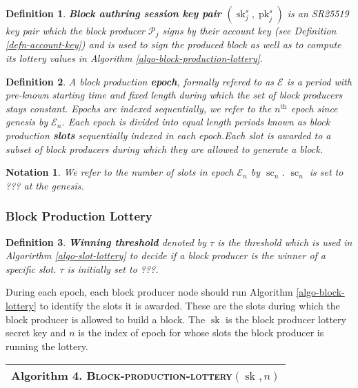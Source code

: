 \documentclass{article}
\newcommand{\tmname}[1]{\textsc{#1}}
\newcommand{\tmop}[1]{\ensuremath{\operatorname{#1}}}
\newcommand{\tmstrong}[1]{\textbf{#1}}
\newcommand{\tmtextbf}[1]{{\bfseries{#1}}}
\newcommand{\tmtextsc}[1]{{\scshape{#1}}}
\newcounter{tmcounter}
\newcommand{\custombinding}[1]{%
  \setcounter{tmcounter}{#1}%
  \addtocounter{tmcounter}{-1}%
  \refstepcounter{tmcounter}}
\newtheorem{definition}{Definition}
\newtheorem{notation}{Notation}
\providecommand{\tmname}[1]{\tmtextsc{#1}}
\providecommand{\tmop}[1]{\ensuremath{\mathrm{#1}}}
\providecommand{\tmstrong}[1]{\tmtextbf{#1}}
\providecommand{\tmtextbf}[1]{\tmtextbf{#1}}
\newtheorem{definition}{Definition}
\newtheorem{notation}{Notation}
\begin{document}
\begin{definition}
  {\tmstrong{Block authring session key pair $(\tmop{sk}^s_j,
  \tmop{pk}^s_j)$}} is an SR25519 key pair which the block producer
  $\mathcal{P}_j$ signs by their account key (see Definition
  \ref{defn-account-key}) and is used to sign the produced block as well as to
  compute its lottery values in Algorithm \ref{algo-block-production-lottery}.
  
\end{definition}

\begin{definition}
  A block production {\tmstrong{epoch}}, formally refered to as $\mathcal{E}$
  is a period with pre-known starting time and fixed length during which the
  set of block producers stays constant. Epochs are indexed sequentially, we
  refer to the $n^{\tmop{th}}$ epoch since genesis by $\mathcal{E}_n$. Each
  epoch is divided into equal length periods known as block production
  {\tmstrong{slots}} sequentially indexed in each epoch.Each slot is awarded
  to a subset of block producers during which they are allowed to generate a
  block.
\end{definition}

\begin{notation}
  We refer to the number of slots in epoch $\mathcal{E}_n$ by $\tmop{sc}_n$.
  $\tmop{sc}_n$ is set to ??? at the genesis. 
\end{notation}

\subsubsection{Block Production Lottery}

\begin{definition}
  {\tmstrong{Winning threshold}} denoted by {\tmstrong{$\tau$}} is the
  threshold which is used in Algorirthm \ref{algo-slot-lottery} to decide if a
  block producer is the winner of a specific slot. $\tau$ is initially set to
  ???.
\end{definition}

During each epoch, each block producer node should run Algorithm
\ref{algo-block-lottery} to identify the slots it is awarded. These are the
slots during which the block producer is allowed to build a block. The
$\tmop{sk}$ is the block producer lottery secret key and $n$ is the index of
epoch for whose slots the block producer is running the lottery.

\custombinding{4}{\noindent}\begin{tabular}{l}
  \hline
  \tmtextbf{Algorithm  4. }
  \label{algo-block-production-lottery}{\tmname{Block-production-lottery}}$(\tmop{sk}^{},
  n)$\\
  \hline
\end{tabular}
\end{document}
